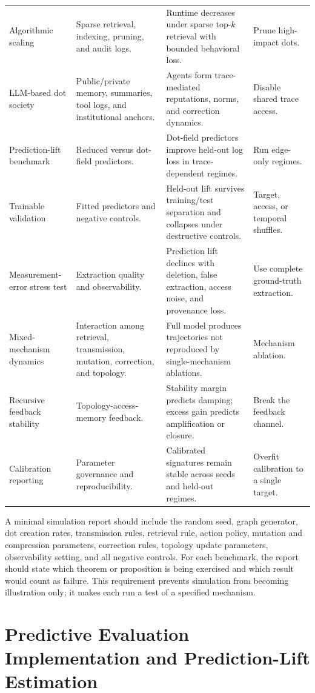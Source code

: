 \documentclass[11pt]{article}
\theoremstyle{remark}
\begin{document}
{\begin{longtable}[]{@{}L{0.17\textwidth}L{0.31\textwidth}L{0.31\textwidth}L{0.14\textwidth}@{}}
Algorithmic scaling & Sparse retrieval, indexing, pruning, and audit logs. & Runtime decreases under sparse top-$k$ retrieval with bounded behavioral loss. & Prune high-impact dots.\\
LLM-based dot society & Public/private memory, summaries, tool logs, and institutional anchors. & Agents form trace-mediated reputations, norms, and correction dynamics. & Disable shared trace access.\\
Prediction-lift benchmark & Reduced versus dot-field predictors. & Dot-field predictors improve held-out log loss in trace-dependent regimes. & Run edge-only regimes.\\
Trainable validation & Fitted predictors and negative controls. & Held-out lift survives training/test separation and collapses under destructive controls. & Target, access, or temporal shuffles.\\
Measurement-error stress test & Extraction quality and observability. & Prediction lift declines with deletion, false extraction, access noise, and provenance loss. & Use complete ground-truth extraction.\\
Mixed-mechanism dynamics & Interaction among retrieval, transmission, mutation, correction, and topology. & Full model produces trajectories not reproduced by single-mechanism ablations. & Mechanism ablation.\\
Recursive feedback stability & Topology-access-memory feedback. & Stability margin predicts damping; excess gain predicts amplification or closure. & Break the feedback channel.\\
Calibration reporting & Parameter governance and reproducibility. & Calibrated signatures remain stable across seeds and held-out regimes. & Overfit calibration to a single target.\\
\bottomrule
\end{longtable}
}

A minimal simulation report should include the random seed, graph generator, dot creation rates, transmission rules, retrieval rule, action policy, mutation and compression parameters, correction rules, topology update parameters, observability setting, and all negative controls. For each benchmark, the report should state which theorem or proposition is being exercised and which result would count as failure. This requirement prevents simulation from becoming illustration only; it makes each run a test of a specified mechanism.

\section{Predictive Evaluation Implementation and Prediction-Lift Estimation}\label{predictive-evaluation-implementation}
\end{document}
